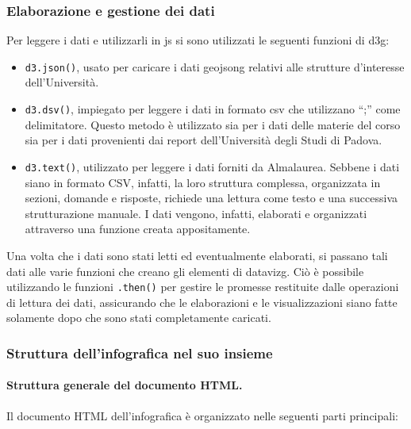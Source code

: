 \subsubsection{Elaborazione e gestione dei dati}
Per leggere i dati e utilizzarli in \gls{js} si sono utilizzati le seguenti funzioni di \gls{d3g}:
\begin{itemize}
    \item \texttt{d3.json()}, usato per caricare i dati \gls{geojsong} relativi alle strutture d'interesse dell'Università.
    \item \texttt{d3.dsv()}, impiegato per leggere i dati in formato \gls{csv} che utilizzano ``;'' come delimitatore. 
    Questo metodo è utilizzato sia per i dati delle materie del corso sia per i dati provenienti dai report dell'Università degli Studi di Padova.
    \item \texttt{d3.text()}, utilizzato per leggere i dati forniti da Almalaurea. Sebbene i dati siano in formato CSV, infatti, la loro struttura complessa, 
    organizzata in sezioni, domande e risposte, richiede una lettura come testo e una successiva strutturazione manuale. 
    I dati vengono, infatti, elaborati e organizzati attraverso una funzione creata appositamente.
\end{itemize}
Una volta che i dati sono stati letti ed eventualmente elaborati, si passano tali dati alle varie funzioni che creano 
gli elementi di \gls{datavizg}. Ciò è possibile utilizzando le funzioni \texttt{.then()} per gestire le promesse restituite dalle operazioni 
di lettura dei dati, assicurando che le elaborazioni e le visualizzazioni siano fatte solamente dopo che sono stati completamente caricati. 


\subsubsection{Struttura dell'infografica nel suo insieme}
\paragraph{Struttura generale del documento HTML.} Il documento HTML dell'infografica è organizzato nelle seguenti parti principali:

